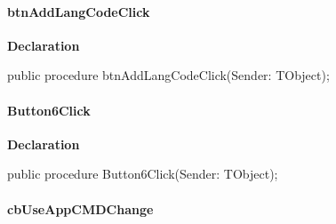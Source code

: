 \documentclass{report}
\newif\ifpdf
\begin{document}
\paragraph*{btnAddLangCodeClick}\hspace*{\fill}

\label{prjwizard.TfrmProjectWizard-btnAddLangCodeClick}
\begin{list}{}{
\setlength{\itemindent}{0cm}
\setlength{\listparindent}{0cm}
\setlength{\leftmargin}{\evensidemargin}
\addtolength{\leftmargin}{\tmplength}
\settowidth{\labelsep}{X}
\addtolength{\leftmargin}{\labelsep}
\setlength{\labelwidth}{\tmplength}
}
\item[\textbf{Declaration}\hfill]
\ifpdf
\begin{flushleft}
\fi
\begin{ttfamily}
public procedure btnAddLangCodeClick(Sender: TObject);\end{ttfamily}

\ifpdf
\end{flushleft}
\fi

\end{list}
\paragraph*{Button6Click}\hspace*{\fill}

\label{prjwizard.TfrmProjectWizard-Button6Click}
\begin{list}{}{
\setlength{\itemindent}{0cm}
\setlength{\listparindent}{0cm}
\setlength{\leftmargin}{\evensidemargin}
\addtolength{\leftmargin}{\tmplength}
\settowidth{\labelsep}{X}
\addtolength{\leftmargin}{\labelsep}
\setlength{\labelwidth}{\tmplength}
}
\item[\textbf{Declaration}\hfill]
\ifpdf
\begin{flushleft}
\fi
\begin{ttfamily}
public procedure Button6Click(Sender: TObject);\end{ttfamily}

\ifpdf
\end{flushleft}
\fi

\end{list}
\paragraph*{cbUseAppCMDChange}\hspace*{\fill}
\end{document}
